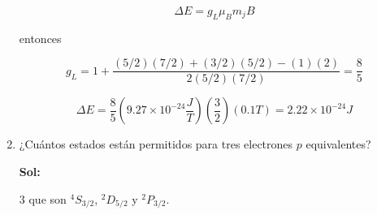 \documentclass[12pt,a4paper]{article}
\begin{document}
\begin{enumerate}
\begin{equation*}
    \Delta E = g_L \mu_B m_j B
\end{equation*}

entonces

\begin{equation*}
    g_L = 1+\frac{(5/2)(7/2)+(3/2)(5/2)-(1)(2)}{2(5/2)(7/2)} = \frac{8}{5}
\end{equation*}

\begin{equation*}
    \Delta E =  \frac{8}{5} \left(9.27\times 10^{-24}\frac{J}{T}\right) \left(\frac{3}{2}\right) (0.1T) =  2.22 \times 10^{-24} J
\end{equation*}







\item ¿Cuántos estados están permitidos para tres electrones $p$ equivalentes?

\textbf{Sol:}

$3$ que son $^4S_{3/2}$, $^{2}D_{5/2}$ y $^{2}P_{3/2}$.


    
    
\end{enumerate}
\end{document}
